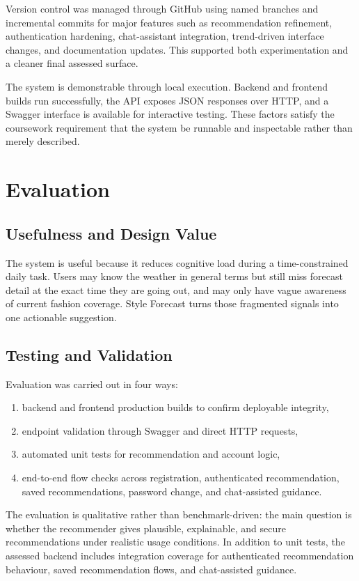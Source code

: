 \documentclass[11pt,a4paper]{article}
\begin{document}
Version control was managed through GitHub using named branches and incremental commits for major features such as recommendation refinement, authentication hardening, chat-assistant integration, trend-driven interface changes, and documentation updates. This supported both experimentation and a cleaner final assessed surface.

The system is demonstrable through local execution. Backend and frontend builds run successfully, the API exposes JSON responses over HTTP, and a Swagger interface is available for interactive testing. These factors satisfy the coursework requirement that the system be runnable and inspectable rather than merely described.

\section{Evaluation}
\subsection{Usefulness and Design Value}
The system is useful because it reduces cognitive load during a time-constrained daily task. Users may know the weather in general terms but still miss forecast detail at the exact time they are going out, and may only have vague awareness of current fashion coverage. Style Forecast turns those fragmented signals into one actionable suggestion.

\subsection{Testing and Validation}
Evaluation was carried out in four ways:
\begin{enumerate}
  \item backend and frontend production builds to confirm deployable integrity,
  \item endpoint validation through Swagger and direct HTTP requests,
  \item automated unit tests for recommendation and account logic,
  \item end-to-end flow checks across registration, authenticated recommendation, saved recommendations, password change, and chat-assisted guidance.
\end{enumerate}

The evaluation is qualitative rather than benchmark-driven: the main question is whether the recommender gives plausible, explainable, and secure recommendations under realistic usage conditions. In addition to unit tests, the assessed backend includes integration coverage for authenticated recommendation behaviour, saved recommendation flows, and chat-assisted guidance.
\end{document}
